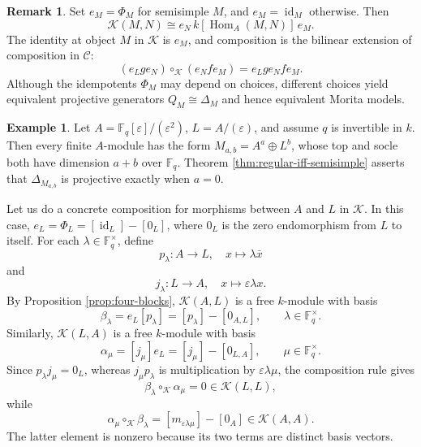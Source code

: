 \documentclass[10pt, reqno]{amsart}
\theoremstyle{plain}
\numberwithin{equation}{section}
\theoremstyle{definition}
\newtheorem{example}[theorem]{Example}
\newtheorem{remark}[theorem]{Remark}
\newcommand{\Hom}{\operatorname{Hom}}
\newcommand{\id}{\operatorname{id}}
\newcommand{\C}{\mathscr C}
\newcommand{\K}{\mathcal K}
\begin{document}
\begin{remark}
Set $e_M = \Phi_M$ for semisimple $M$, and $e_M = \id_M$ otherwise. Then
\[
\K(M,N) \cong e_N\,k[\Hom_A(M,N)]\,e_M.
\]
The identity at object $M$ in $\mathscr{K}$ is $e_M$, and composition is the bilinear extension of composition in $\C$:
\[
(e_L g e_N) \circ_{\K} (e_N f e_M) = e_L g e_N f e_M.
\]
Although the idempotents $\Phi_M$ may depend on choices, different choices yield equivalent projective generators $Q_M \cong \Delta_M$ and hence equivalent Morita models.
\end{remark}

\begin{example}\label{ex:dual-numbers}
Let $A=\mathbb{F}_q[\varepsilon]/(\varepsilon^2)$, $L = A/(\varepsilon)$, and assume $q$ is invertible in $k$. Then every finite $A$-module has the form $M_{a,b} = A^a \oplus L^b$, whose top and socle both have dimension $a+b$ over $\mathbb F_q$. Theorem \ref{thm:regular-iff-semisimple} asserts that $\Delta_{M_{a,b}}$ is projective exactly when $a = 0$.

Let us do a concrete composition for morphisms between $A$ and $L$ in $\mathscr{K}$. In this case, $e_L = \Phi_L = [\id_L]-[0_L]$, where $0_L$ is the zero endomorphism from $L$ to itself. For each $\lambda \in \mathbb{F}_q^{\times}$, define
\[
p_{\lambda}: A \longrightarrow L, \quad x \longmapsto \lambda \bar{x}
\]
and
\[
j_{\lambda}: L \longrightarrow A, \quad x \longmapsto \varepsilon \lambda x.
\]
By Proposition \ref{prop:four-blocks}, $\mathscr K(A,L)$ is a free $k$-module with basis
\[
\beta_\lambda = e_L[p_\lambda] = [p_\lambda] - [0_{A,L}], \qquad \lambda\in \mathbb{F}_q^\times.
\]
Similarly, $\mathscr K(L,A)$ is a free $k$-module with basis
\[
\alpha_\mu = [j_\mu] e_L = [j_\mu] - [0_{L,A}], \qquad \mu \in\mathbb{F}_q^\times.
\]
Since $p_\lambda j_\mu = 0_L$, whereas $j_\mu p_\lambda$ is multiplication by $\varepsilon\lambda\mu$, the composition rule gives
\[
\beta_\lambda \circ_{\mathscr{K}} \alpha_\mu = 0 \in \mathscr K(L,L),
\]
while
\[
\alpha_\mu \circ_{\mathscr{K}} \beta_\lambda = [m_{\varepsilon\lambda\mu}] - [0_A] \in \mathscr{K}(A,A).
\]
The latter element is nonzero because its two terms are distinct basis vectors.
\end{example}
\end{document}
